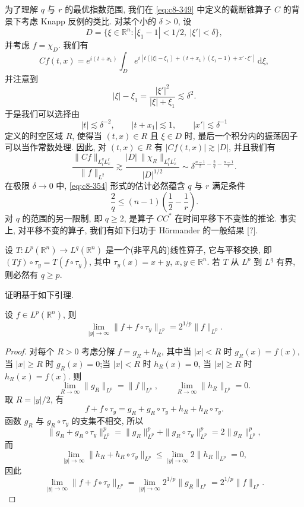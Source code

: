 
为了理解 $q$ 与 $r$ 的最优指数范围, 我们在 \eqref{eq:c8-349} 中定义的截断锥算子 $C$ 的背景下考虑 Knapp 反例的类比. 对某个小的 $\delta>0$, 设
\[
D=\bigl\{\xi\in\mathbb{R}^n:|\xi_1-1|<1/2, \ |\xi'|<\delta\bigr\}, 
\]
并考虑 $f=\chi_D$. 我们有
\[
Cf(t, x)=e^{i(t+x_1)}\int_D e^{i[t(|\xi|-\xi_1)+(t+x_1)(\xi_1-1)+x'\cdot\xi']}\, \mathrm{d}\xi, 
\]
并注意到
\[
|\xi|-\xi_1=\frac{|\xi'|^2}{|\xi|+\xi_1}\lesssim\delta^2 .
\]
于是我们可以选择由
\[
|t|\lesssim\delta^{-2}, \qquad |t+x_1|\lesssim1, \qquad |x'|\lesssim\delta^{-1}
\]
定义的时空区域 $R$, 使得当 $(t, x)\in R$ 且 $\xi\in D$ 时, 最后一个积分内的振荡因子可以当作常数处理. 因此, 对 $(t, x)\in R$ 有 $|Cf(t, x)|\gtrsim|D|$, 并且我们有
\[
\frac{\|Cf\|_{L_t^q L_x^r}}{\|f\|_{L^2}}\gtrsim\frac{|D|\, \|\chi_R\|_{L_t^q L_x^r}}{|D|^{1/2}}\sim\delta^{\frac{n-1}{2}-\frac{2}{q}-\frac{n-1}{r}} .
\]
在极限 $\delta\to0$ 中, \eqref{eq:c8-354} 形式的估计必然蕴含 $q$ 与 $r$ 满足条件
\begin{equation}
\frac{2}{q}\leq(n-1)\left(\frac{1}{2}-\frac{1}{r}\right).\label{eq:c8-366}
\end{equation}
对 $q$ 的范围的另一限制, 即 $q\geq2$, 是算子 $CC^{*}$ 在时间平移下不变性的推论. 事实上, 对平移不变的算子, 我们有如下归功于 Hörmander 的一般结果 [?]. 

\begin{proposition}\label{prop:c8-0.47}
设 $T:L^p(\mathbb{R}^n)\to L^q(\mathbb{R}^n)$ 是一个(非平凡的)线性算子, 它与平移交换, 即 $(Tf)\circ\tau_y=T(f\circ\tau_y)$, 其中 $\tau_y(x)=x+y$, $x, y\in\mathbb{R}^n$. 若 $T$ 从 $L^p$ 到 $L^q$ 有界, 则必然有 $q\geq p$. 
\end{proposition}

证明基于如下引理. 

\begin{lemma}\label{lem:c8-0.48}
设 $f\in L^p(\mathbb{R}^n)$, 则
\[
\lim_{|y|\to\infty}\|f+f\circ\tau_y\|_{L^p}=2^{1/p}\|f\|_{L^p}.
\]
\end{lemma}

\begin{proof}
对每个 $R>0$ 考虑分解 $f=g_R+h_R$, 其中当 $|x|<R$ 时 $g_R(x)=f(x)$, 当 $|x|\geq R$ 时 $g_R(x)=0$;当 $|x|<R$ 时 $h_R(x)=0$, 当 $|x|\geq R$ 时 $h_R(x)=f(x)$. 则
\[
\lim_{R\to\infty}\|g_R\|_{L^p}=\|f\|_{L^p}, \qquad \lim_{R\to\infty}\|h_R\|_{L^p}=0.
\]
取 $R=|y|/2$, 有
\[
f+f\circ\tau_y=g_R+g_R\circ\tau_y+h_R+h_R\circ\tau_y .
\]
函数 $g_R$ 与 $g_R\circ\tau_y$ 的支集不相交, 所以
\[
\|g_R+g_R\circ\tau_y\|_{L^p}^p=\|g_R\|_{L^p}^p+\|g_R\circ\tau_y\|_{L^p}^p=2\|g_R\|_{L^p}^p, 
\]
而
\[
\lim_{|y|\to\infty}\|h_R+h_R\circ\tau_y\|_{L^p}\leq\lim_{|y|\to\infty}2\|h_R\|_{L^p}=0, 
\]
因此
\[
\lim_{|y|\to\infty}\|f+f\circ\tau_y\|_{L^p}=\lim_{|y|\to\infty}2^{1/p}\|g_R\|_{L^p}=2^{1/p}\|f\|_{L^p}.
\]
\end{proof}

